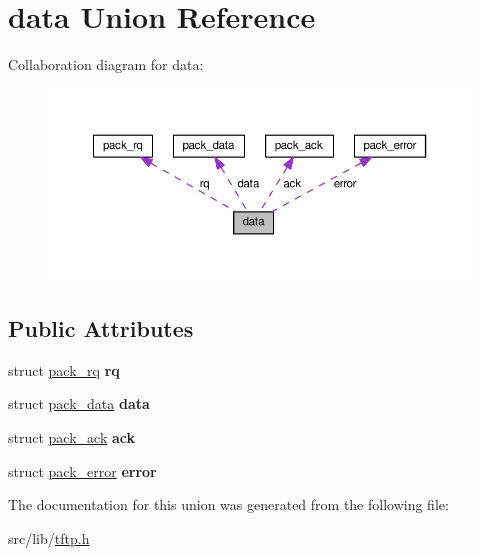 \hypertarget{uniondata}{}\section{data Union Reference}
\label{uniondata}


Collaboration diagram for data\+:\nopagebreak
\begin{figure}[H]
\begin{center}
\leavevmode
\includegraphics[width=350pt]{uniondata__coll__graph}
\end{center}
\end{figure}
\subsection*{Public Attributes}
\begin{DoxyCompactItemize}
\item 
struct \hyperlink{structpack__rq}{pack\+\_\+rq} {\bfseries rq}\hypertarget{uniondata_acf4172048a0f6d3c7259374b38040c62}{}\label{uniondata_acf4172048a0f6d3c7259374b38040c62}

\item 
struct \hyperlink{structpack__data}{pack\+\_\+data} {\bfseries data}\hypertarget{uniondata_a729b3758577c1e6f2b5ce2325a4dc49b}{}\label{uniondata_a729b3758577c1e6f2b5ce2325a4dc49b}

\item 
struct \hyperlink{structpack__ack}{pack\+\_\+ack} {\bfseries ack}\hypertarget{uniondata_a0b33fddc0ac4377dc9d7f21987686417}{}\label{uniondata_a0b33fddc0ac4377dc9d7f21987686417}

\item 
struct \hyperlink{structpack__error}{pack\+\_\+error} {\bfseries error}\hypertarget{uniondata_a633fcc64b90ce21b13b425987a6e78b8}{}\label{uniondata_a633fcc64b90ce21b13b425987a6e78b8}

\end{DoxyCompactItemize}


The documentation for this union was generated from the following file\+:\begin{DoxyCompactItemize}
\item 
src/lib/\hyperlink{tftp_8h}{tftp.\+h}\end{DoxyCompactItemize}
